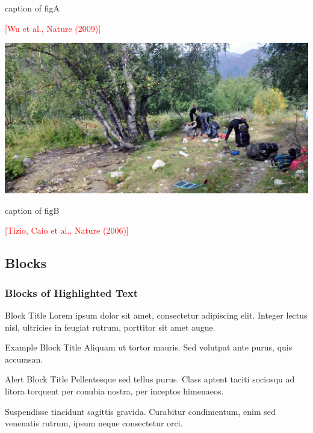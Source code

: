 \documentclass[
11pt, %
]{beamer}
\begin{document}
\begin{frame}
\begin{minipage}{.5\textwidth}
			caption of figA
			
			\scriptsize\textcolor{red}{[Wu et al., Nature (2009)]}
		\end{minipage}%
		\begin{minipage}{.5\textwidth}
			\centering
			\includegraphics[height=0.55\textheight]{../pics/DSC_1181}
			
			caption of figB
			
			\scriptsize\textcolor{red}{[Tizio, Caio et al., Nature (2006)]}
		\end{minipage}
	\end{frame}

	

	
	
	\subsection{Blocks}
	
	\begin{frame}
		\frametitle{Blocks of Highlighted Text}
		
		\begin{block}{Block Title}
			Lorem ipsum dolor sit amet, consectetur adipiscing elit. Integer lectus nisl, ultricies in feugiat rutrum, porttitor sit amet augue.
		\end{block}
		
		\begin{exampleblock}{Example Block Title}
			Aliquam ut tortor mauris. Sed volutpat ante purus, quis accumsan.
		\end{exampleblock}
		
		\begin{alertblock}{Alert Block Title}
			Pellentesque sed tellus purus. Class aptent taciti sociosqu ad litora torquent per conubia nostra, per inceptos himenaeos.
		\end{alertblock}
		
		\begin{block}{} %
			Suspendisse tincidunt sagittis gravida. Curabitur condimentum, enim sed venenatis rutrum, ipsum neque consectetur orci.
		\end{block}
	\end{frame}
	
\end{document}
